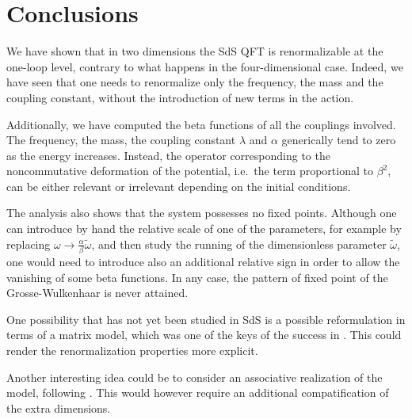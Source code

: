 \documentclass[a4paper,10pt]{amsart}
\newcommand{\nocol}[1]{{#1}}
\begin{document}
 \section{Conclusions}\label{sec:conclusions}

 We have shown that in two dimensions the SdS QFT is renormalizable at the one-loop level,
 contrary to what happens in the four-dimensional case.
 Indeed, we have seen that one needs to renormalize only the frequency, the mass and the coupling constant,
without the introduction of new terms in the action.

 Additionally, we have computed the beta functions of all the couplings involved.
 The frequency, the mass, the coupling constant $\lambda$ and $\alpha$ generically tend to zero as the energy increases.
 Instead, the operator corresponding to the noncommutative deformation of the potential,
 i.e.~the term  proportional to $\beta^2$,
 can be either relevant or irrelevant depending on the initial conditions.

 The analysis also shows that the system possesses no fixed points.
\nocol{Although one can introduce by hand the relative scale of one of the parameters,
 for example by replacing $\omega\rightarrow \frac{\alpha}{\beta}\tilde\omega$,
 and then study the running of the dimensionless parameter $\tilde\omega$,
 one would need to introduce also an additional relative sign in order to allow the vanishing of some beta functions.
 In any case, the pattern of fixed point of the Grosse-Wulkenhaar \cite{Grosse:2004by} is never attained.
 }

 \nocol{
 One possibility that has not yet been studied in SdS is a possible reformulation in terms of a matrix model,
 which was one of the keys of the success in \cite{Grosse:2005da}.
 This could render the renormalization properties more explicit.
}

\nocol{ Another interesting idea could be to consider an associative realization of the model, following \cite{Meljanac:2020fde}.
This would however require an additional compatification of the extra dimensions.}
\end{document}
